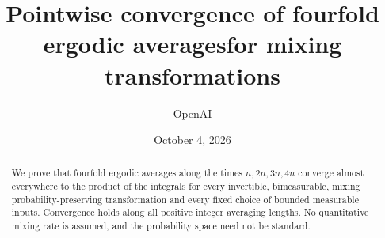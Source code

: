 \documentclass[11pt]{article}
\title{Pointwise convergence of fourfold ergodic averages\newline for mixing transformations}
\author{OpenAI}
\date{October 4, 2026}
\numberwithin{equation}{section}
\theoremstyle{definition}
\theoremstyle{remark}
\newcommand{\1}{\mathbf 1}
\begin{document}
\maketitle
\begin{abstract}
We prove that fourfold ergodic averages along the times $n,2n,3n,4n$
converge almost everywhere to the product of the integrals for every
invertible, bimeasurable, mixing probability-preserving transformation
and every fixed choice of bounded measurable inputs. Convergence holds
along all positive integer averaging lengths. No quantitative mixing
rate is assumed, and the probability space need not be standard.
\end{abstract}






\appendix


\end{document}
